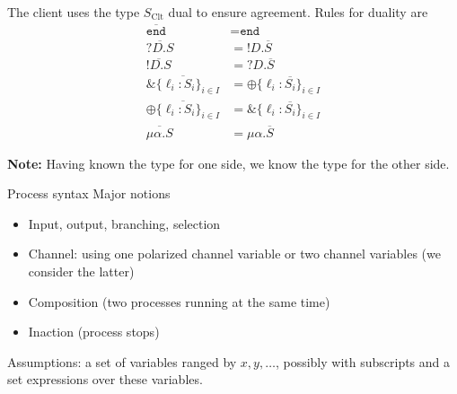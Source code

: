 \begin{frame}
  The client uses the type $S_{\text{Clt}}$ dual to ensure agreement. Rules for duality are
  \begin{align*}
    \overline{\texttt{end}}                  & = \texttt{end}                             \\
    \overline{?D.S}                          & = !D.\overline{S}                          \\
    \overline{!D.S}                          & = ?D.\overline{S}                          \\
    \overline{\&\{\ell_i:S_i\}_{i\in I}}     & = \oplus\{\ell_i:\overline{S_i}\}_{i\in I} \\
    \overline{\oplus\{\ell_i:S_i\}_{i\in I}} & = \&\{\ell_i:\overline{S_i}\}_{i\in I}     \\
    \overline{\mu\alpha.S}                   & = \mu\alpha.\overline{S}
  \end{align*}

  \textbf{Note:} Having known the type for one side, we know the type for the other side.
\end{frame}

\begin{frame}{Process syntax}
  Major notions
  \begin{itemize}
    \item Input, output, branching, selection
    \item Channel: using one polarized channel variable or two channel variables (we consider the latter)
    \item Composition (two processes running at the same time)
    \item Inaction (process stops)
  \end{itemize}

  Assumptions: a set of variables ranged by $x,y,\ldots$, possibly with subscripts and a set expressions over these variables.
\end{frame}

